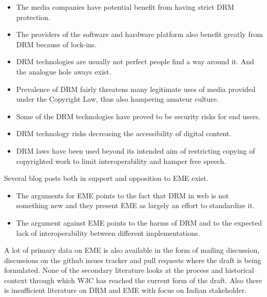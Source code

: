 \documentclass{article}
\begin{document}
\begin{itemize}

\item The media companies have potential benefit from having strict DRM protection. \cite{varian2005copying}

\item The providers of the software and hardware platform also benefit greatly from
  DRM because of lock-ins. \cite{varian2007drm}

\item DRM technologies are usually not perfect people find a way around it. And the
  analogue hole aways exist. %

\item Prevalence of DRM fairly threatens many legitimate uses of media provided under
  the Copyright Law, thus also hampering amateur culture. \cite{eff_unintended_2013}

\item Some of the DRM technologies have proved to be security risks for end
users. \cite{anderson2008security} %

\item DRM technology risks decreasing the accessibility of digital content.
\cite{cory_doctorow_interoperability_2016}

\item DRM laws have been used beyond its intended aim of restricting copying of
  copyrighted work to limit interoperability and hamper free speech.
\cite{eff_unintended_2013}

\end{itemize}

Several blog posts both in support and opposition to EME exist.

\begin{itemize}

\item The arguments for EME points to the fact that DRM in web is not something
new and they present EME as largely an effort to standardize it. \cite{w3c_information_????}

\item The argument against EME points to the harms of DRM and to the
  expected lack of interoperability between different implementations. \cite{cory_doctorow_interoperability_2016}


\end{itemize}

A lot of primary data on EME is also available in the form of mailing
discussion, discussions on the github issues tracker and pull requests where
the draft is being formulated.  None of the secondary literature looks at the
process and historical context through which W3C has reached the current form
of the draft. Also there is insufficient literature on DRM and EME with focus
on Indian stakeholder.
\end{document}
